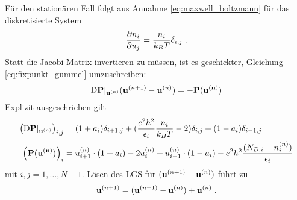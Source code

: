 Für den stationären Fall folgt aus Annahme \eqref{eq:maxwell_boltzmann} für das diskretisierte System
\begin{align}
  \frac{\mathrm{\partial}n_i}{\mathrm{\partial}u_j} = \frac{n_i}{k_B T}\delta_{i,j} \; .
\end{align}
Statt die Jacobi-Matrix invertieren zu müssen, ist es geschickter, Gleichung \eqref{eq:fixpunkt_gummel} umzuschreiben:
\begin{align}
  \mathrm{D}\vb{P}|_{\vb{u}^{(n)}}(\vb{u}^{(n+1)} - \vb{u}^{(n)}) = -  \vb{P}(\vb{u^{(n)}})
\end{align}
Explizit ausgeschrieben gilt
\begin{align}
  \left(\mathrm{D}\vb{P}|_{\vb{u}^{(n)}}\right)_{i,j} &=
    (1+a_i)\delta_{i+1,j} + ( \frac{e^2h^2}{\epsilon_i}\frac{n_i}{k_B T} - 2) \delta_{i,j} + (1-a_i)\delta_{i-1,j} \\
  \left( \vb{P}(\vb{u^{(n)}}) \right)_{i} &=
   u_{i+1}^{(n)}\cdot(1+a_i) -2 u_i^{(n)} + u_{i-1}^{(n)}\cdot(1-a_i) - e^2h^2\frac{(N_{D,i} - n_i^{(n)})}{\epsilon_i}
\end{align}
mit $i,j = 1,\dots,N-1$. Lösen des LGS für $(\vb{u}^{(n+1)} - \vb{u}^{(n)})$ führt zu
\begin{align}
  \vb{u}^{(n+1)} = (\vb{u}^{(n+1)} - \vb{u}^{(n)}) + \vb{u}^{(n)} \; .
\end{align}

